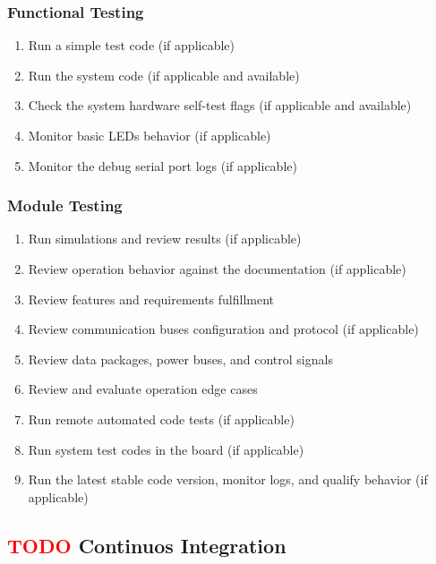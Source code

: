 \subsubsection{Functional Testing}
\begin{enumerate} \setlength\itemsep{-0.3em}
    \item Run a simple test code (if applicable) 
    \item Run the system code (if applicable and available) 
    \item Check the system hardware self-test flags (if applicable and available) 
    \item Monitor basic LEDs behavior (if applicable) 
    \item Monitor the debug serial port logs (if applicable)
\end{enumerate}

\subsubsection{Module Testing}
\begin{enumerate} \setlength\itemsep{-0.3em}
    \item Run simulations and review results (if applicable)
    \item Review operation behavior against the documentation (if applicable)
    \item Review features and requirements fulfillment
    \item Review communication buses configuration and protocol (if applicable)
    \item Review data packages, power buses, and control signals
    \item Review and evaluate operation edge cases
    \item Run remote automated code tests (if applicable)
    \item Run system test codes in the board (if applicable)
    \item Run the latest stable code version, monitor logs, and qualify behavior (if applicable)
\end{enumerate}

\subsection{ \textcolor{red}{TODO} Continuos Integration}

